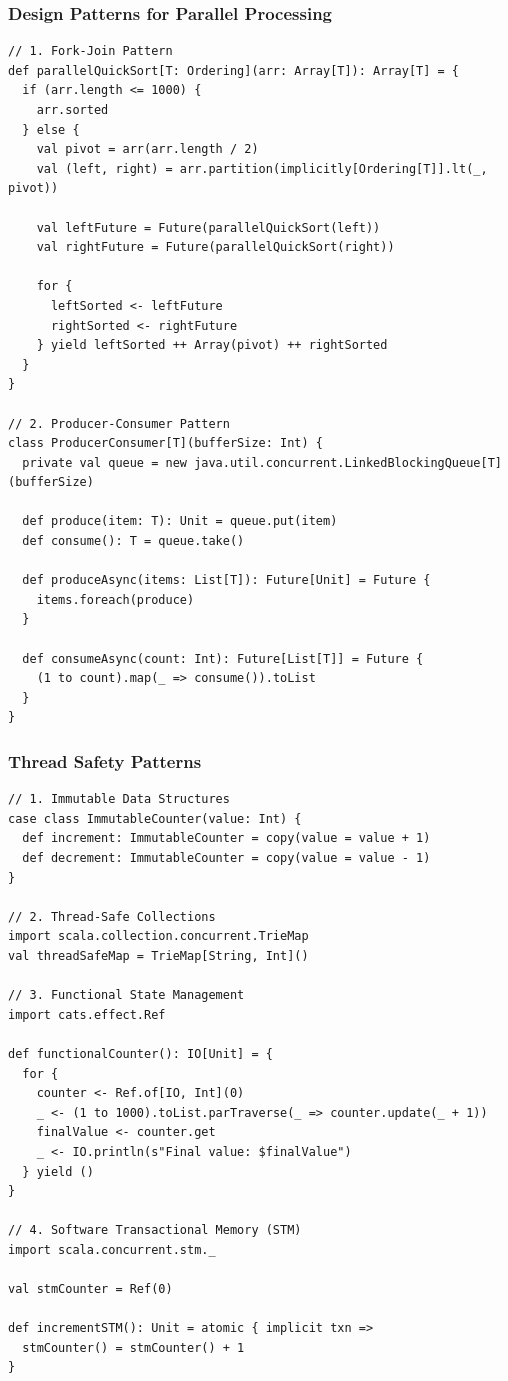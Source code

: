 \documentclass{beamer}
\begin{document}
\begin{frame}[fragile]
\frametitle{Design Patterns for Parallel Processing}

\begin{lstlisting}[style=scalaStyle]
// 1. Fork-Join Pattern
def parallelQuickSort[T: Ordering](arr: Array[T]): Array[T] = {
  if (arr.length <= 1000) {
    arr.sorted
  } else {
    val pivot = arr(arr.length / 2)
    val (left, right) = arr.partition(implicitly[Ordering[T]].lt(_, pivot))
    
    val leftFuture = Future(parallelQuickSort(left))
    val rightFuture = Future(parallelQuickSort(right))
    
    for {
      leftSorted <- leftFuture
      rightSorted <- rightFuture
    } yield leftSorted ++ Array(pivot) ++ rightSorted
  }
}

// 2. Producer-Consumer Pattern
class ProducerConsumer[T](bufferSize: Int) {
  private val queue = new java.util.concurrent.LinkedBlockingQueue[T](bufferSize)
  
  def produce(item: T): Unit = queue.put(item)
  def consume(): T = queue.take()
  
  def produceAsync(items: List[T]): Future[Unit] = Future {
    items.foreach(produce)
  }
  
  def consumeAsync(count: Int): Future[List[T]] = Future {
    (1 to count).map(_ => consume()).toList
  }
}
\end{lstlisting}

\end{frame}

\begin{frame}[fragile]
\frametitle{Thread Safety Patterns}

\begin{lstlisting}[style=scalaStyle]
// 1. Immutable Data Structures
case class ImmutableCounter(value: Int) {
  def increment: ImmutableCounter = copy(value = value + 1)
  def decrement: ImmutableCounter = copy(value = value - 1)
}

// 2. Thread-Safe Collections
import scala.collection.concurrent.TrieMap
val threadSafeMap = TrieMap[String, Int]()

// 3. Functional State Management
import cats.effect.Ref

def functionalCounter(): IO[Unit] = {
  for {
    counter <- Ref.of[IO, Int](0)
    _ <- (1 to 1000).toList.parTraverse(_ => counter.update(_ + 1))
    finalValue <- counter.get
    _ <- IO.println(s"Final value: $finalValue")
  } yield ()
}

// 4. Software Transactional Memory (STM)
import scala.concurrent.stm._

val stmCounter = Ref(0)

def incrementSTM(): Unit = atomic { implicit txn =>
  stmCounter() = stmCounter() + 1
}
\end{lstlisting}

\end{frame}
\end{document}

